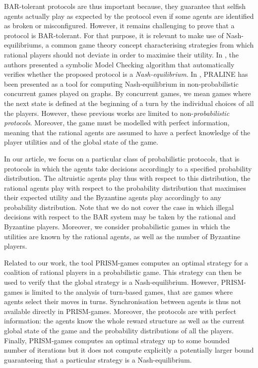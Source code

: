 BAR-tolerant protocols are thus important because, they guarantee that selfish agents actually play as expected by the protocol even if some agents are identified as broken or misconfigured. However, it remains challenging to prove that a protocol is BAR-tolerant. For that purpose, it is relevant to make use of Nash-equilibriums, a common game theory concept characterising strategies from which rational players should not deviate in order to maximise their utility. In \cite{MMSTACL08}, the authors presented a symbolic Model Checking algorithm that automatically verifies whether the proposed protocol is a \emph{Nash-equilibrium}. In \cite{Brenguier13}, PRALINE has been presented as a tool for computing Nash-equilibrium in non-probabilistic concurrent games played on graphs. By concurrent games, we mean games where the next state is defined at the beginning of a turn by the individual choices of all the players. However, these previous works are limited to non-\emph{probabilistic protocols}. Moreover, the game must be modelled with perfect information, meaning that the rational agents are assumed to have a perfect knowledge of the player utilities and of the global state of the game.

In our article, we focus on a particular class of probabilistic protocols, that is  protocols in which the agents take decisions accordingly to a specified probability distribution. The altruistic agents play thus with respect to this distribution, the rational agents play  with respect to the probability distribution that maximises their expected utility and the Byzantine agents play accordingly to any probability distribution. Note that we do not cover the case in which illegal decisions with respect to the BAR system may be taken by the rational and Byzantine players. Moreover, we consider probabilistic games in which the utilities are known by the rational agents, as well as the number of Byzantine players.

Related to our work, the tool PRISM-games \cite{CFKPS13} computes an optimal strategy for a coalition of rational players in a probabilistic game. This strategy can then be used to verify that the global strategy is a Nash-equilibrium. However, PRISM-games is limited to the analysis of turn-based games, that are games where agents select their moves in turns. Synchronisation between agents is thus not available directly in PRISM-games. Moreover, the protocols are with perfect information: the agents know the whole reward structure as well as the current global state of the game and the probability distributions of all the players. Finally, PRISM-games computes an optimal strategy up to some bounded number of iterations but it does not compute explicitly a potentially larger bound guaranteeing that a particular strategy is a Nash-equilibrium.

